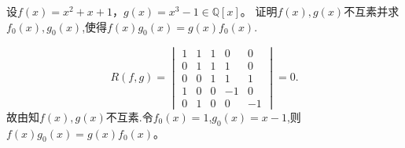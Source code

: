 \documentclass[../../main.tex]{subfiles}%
\begin{document}
\begin{example}
设$f(x)=x^2+x+1$，$g(x)=x^3-1\in\mathbb{Q}[x]$。
证明$f(x),g(x)$不互素并求$f_0(x),g_0(x)$,使得$f(x)g_0(x)=g(x)f_0(x)$.
\end{example}
\begin{solution}

$$R(f,g)=\begin{vmatrix}
1 & 1 & 1 & 0 & 0 \\
0 & 1 & 1 & 1 & 0 \\
0 & 0 & 1 & 1 & 1 \\
1 & 0 & 0 & -1 & 0 \\
0 & 1 & 0 & 0 & -1
\end{vmatrix}=0.$$
故由知$f(x),g(x)$不互素.令$f_0(x)=1$,$g_0(x)=x-1$,则$f(x)g_0(x)=g(x)f_0(x)$。

\end{solution}
\end{document}
